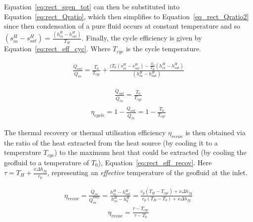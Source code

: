         Equation~\ref{eq:rect_sgen_tot} can then be substituted into Equation~\ref{eq:rect_Qratio}, which then simplifies to Equation~\ref{eq_rect_Qratio2} since then condensation of a pure fluid occurs at constant temperature and so \((s_{in}^{H}-s_{sat}^{H})=\frac{(h_{in}^{H}-h_{sat}^{H})}{T_H}\). Finally, the cycle efficiency is given by Equation~\ref{eq:rect_eff_cyc}. Where \(T_{cyc}\) is the cycle temperature.

        \begin{align}
            \frac{\Dot{Q}_{out}}{\Dot{Q}_{in}} = \frac{T_0}{T_{cyc}} + \frac{(T_0(s_{in}^{H}-s_{sat}^{H}) - \frac{T_0}{T_{H}}(h_{in}^{H}-h_{sat}^{H})}{(h_{in}^{H}-h_{out}^{H})} 
        \end{align}

        \begin{align}
            \frac{\Dot{Q}_{out}}{\Dot{Q}_{in}} = \frac{T_0}{T_{cyc}} \label{eq_rect_Qratio2}
        \end{align}
        \begin{align}
            \eta_{cycle} = 1-\frac{\Dot{Q}_{out}}{\Dot{Q}_{in}} = 1-  \frac{T_0}{T_{cyc}} \label{eq:rect_eff_cyc}
        \end{align}

        The thermal recovery or thermal utilisation efficiency \(\eta_{recov}\) is then obtained via the ratio of the heat extracted from the heat source (by cooling it to a temperature \(T_{cyc}\)) to the maximum heat that could be extracted (by cooling the geofluid to a temperature of \(T_0\)), Equation~\ref{eq:rect_eff_recov}. Here \(\tau = T_H + \frac{x\Delta h_{fg}}{c_p}\), representing an \emph{effective} temperature of the geofluid at the inlet.

        \begin{align}
            \eta_{recov} =\frac{\Dot{Q}_{in}}{\Dot{Q}_{in}^{max}} = \frac{h_{in}^{H}-h_{out}^{H}}{h_{in}^{H}-h_{0}^{H}} = \frac{c_p (T_H - T_{cyc}) + x\Delta h_{fg}}{c_p (T_H - T_0) + x\Delta h_{fg}} 
        \end{align}
        \begin{align}
            \eta_{recov} = \frac{\tau - T_{cyc}}{\tau - T_0} \label{eq:rect_eff_recov}
        \end{align}

